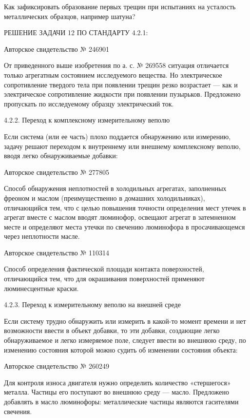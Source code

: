 Как  зафиксировать   образование  первых  трещин  при   испытаниях  на
усталость металлических образцов, например шатуна?


РЕШЕНИЕ ЗАДАЧИ 12 ПО СТАНДАРТУ 4.2.1:


Авторское свидетельство № 246901

От приведенного выше изобретения по а. с. № 269558 ситуация отличается
только агрегатным  состоянием исследуемого вещества.  Но электрическое
сопротивление твердого  тела при  появлении трещин резко  возрастает —
как и  электрическое сопротивление  жидкости при  появлении пузырьков.
Предложено пропускать по исследуемому образцу электрический ток.


4.2.2. Переход к комплексному измерительному веполю

Если система (или ее часть) плохо поддается обнаружению или измерению,
задачу  решают  переходом  к  внутреннему  или  внешнему  комплексному
веполю, вводя легко обнаруживаемые добавки:


Авторское свидетельство № 277805

Способ обнаружения  неплотностей в холодильных  агрегатах, заполненных
фреоном   и  маслом   (преимущественно   в  домашних   холодильниках),
отличающийся  тем, что  с  целью повышения  точности определения  мест
утечек в агрегат вместе с  маслом вводят люминофор, освещают агрегат в
затемненном месте и  определяют места утечки по  свечению люминофора в
просачивающемся через неплотности масле.


Авторское свидетельство № 110314

Способ   определения   фактической  площади   контакта   поверхностей,
отличающийся   тем,  что   для   окрашивания  поверхностей   применяют
люминесцентные краски.


4.2.3. Переход к измерительному веполю на внешней среде

Если систему трудно обнаружить или  измерить в какой-то момент времени
и нет возможности  ввести в объект добавки, то  эти добавки, создающие
легко  обнаруживаемое  и  легко  измеряемое поле,  следует  ввести  во
внешнюю  среду,  по  изменению   состояния  которой  можно  судить  об
изменении состояния объекта:


Авторское свидетельство № 260249

Для контроля износа двигателя нужно определить количество «стершегося»
металла. Частицы  его поступают во  внешнюю среду —  масло. Предложено
добавлять   в  масло   люминофоры:   металлические  частицы   являются
гасителями свечения.

